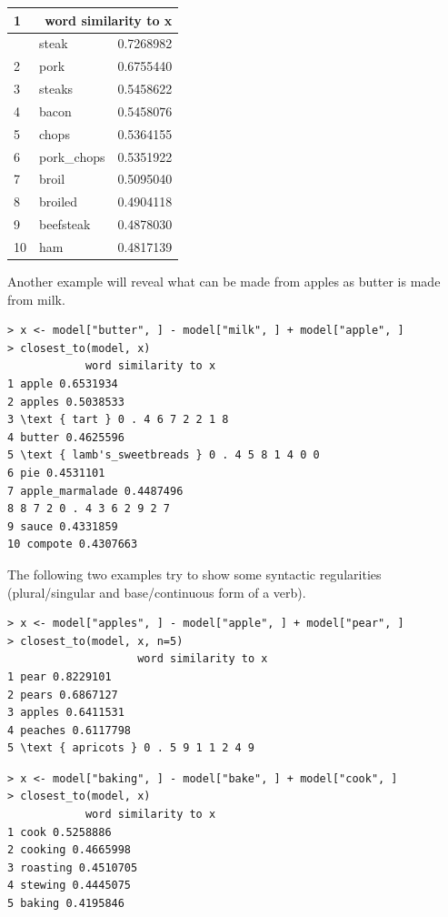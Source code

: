 \documentclass[10pt]{book}
\begin{document}
\begin{center}
\begin{tabular}{|l|l|l|}
\hline
\multirow[b]{2}{*}{1} & \multicolumn{2}{|r|}{word similarity to x} \\
\hline
 & steak & 0.7268982 \\
\hline
2 & pork & 0.6755440 \\
\hline
3 & steaks & 0.5458622 \\
\hline
4 & bacon & 0.5458076 \\
\hline
5 & chops & 0.5364155 \\
\hline
6 & pork\_chops & 0.5351922 \\
\hline
7 & broil & 0.5095040 \\
\hline
8 & broiled & 0.4904118 \\
\hline
9 & beefsteak & 0.4878030 \\
\hline
10 & ham & 0.4817139 \\
\hline
\end{tabular}
\end{center}

Another example will reveal what can be made from apples as butter is made from milk.

\begin{verbatim}
> x <- model["butter", ] - model["milk", ] + model["apple", ]
> closest_to(model, x)
            word similarity to x
1 apple 0.6531934
2 apples 0.5038533
3 \text { tart } 0 . 4 6 7 2 2 1 8
4 butter 0.4625596
5 \text { lamb's_sweetbreads } 0 . 4 5 8 1 4 0 0
6 pie 0.4531101
7 apple_marmalade 0.4487496
8 8 7 2 0 . 4 3 6 2 9 2 7
9 sauce 0.4331859
10 compote 0.4307663
\end{verbatim}

The following two examples try to show some syntactic regularities (plural/singular and base/continuous form of a verb).

\begin{verbatim}
> x <- model["apples", ] - model["apple", ] + model["pear", ]
> closest_to(model, x, n=5)
                    word similarity to x
1 pear 0.8229101
2 pears 0.6867127
3 apples 0.6411531
4 peaches 0.6117798
5 \text { apricots } 0 . 5 9 1 1 2 4 9
\end{verbatim}

\begin{verbatim}
> x <- model["baking", ] - model["bake", ] + model["cook", ]
> closest_to(model, x)
            word similarity to x
1 cook 0.5258886
2 cooking 0.4665998
3 roasting 0.4510705
4 stewing 0.4445075
5 baking 0.4195846
\end{verbatim}
\end{document}
